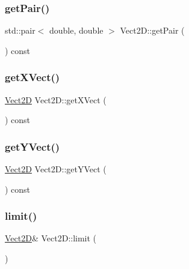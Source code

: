 \mbox{\label{classVect2D_a347f48c0f8fb2f05592251f78be33a5c_a347f48c0f8fb2f05592251f78be33a5c}} 
\subsubsection{\texorpdfstring{get\+Pair()}{getPair()}}
{\footnotesize\ttfamily std\+::pair$<$ double, double $>$ Vect2\+D\+::get\+Pair (\begin{DoxyParamCaption}{ }\end{DoxyParamCaption}) const}

\mbox{\label{classVect2D_a1bf72f44ebf9444c5f52a6499dc8dcb3_a1bf72f44ebf9444c5f52a6499dc8dcb3}} 
\subsubsection{\texorpdfstring{get\+X\+Vect()}{getXVect()}}
{\footnotesize\ttfamily \hyperlink{classVect2D}{Vect2D} Vect2\+D\+::get\+X\+Vect (\begin{DoxyParamCaption}{ }\end{DoxyParamCaption}) const}

\mbox{\label{classVect2D_a13e0a84562e7b1ebef4a530aaacfa060_a13e0a84562e7b1ebef4a530aaacfa060}} 
\subsubsection{\texorpdfstring{get\+Y\+Vect()}{getYVect()}}
{\footnotesize\ttfamily \hyperlink{classVect2D}{Vect2D} Vect2\+D\+::get\+Y\+Vect (\begin{DoxyParamCaption}{ }\end{DoxyParamCaption}) const}

\mbox{\label{classVect2D_a9836fb1bf48b847984cf438a6d48f9c2_a9836fb1bf48b847984cf438a6d48f9c2}} 
\subsubsection{\texorpdfstring{limit()}{limit()}\hspace{0.1cm}{\footnotesize\ttfamily [1/4]}}
{\footnotesize\ttfamily \hyperlink{classVect2D}{Vect2D}\& Vect2\+D\+::limit (\begin{DoxyParamCaption}\item[{const \hyperlink{classVect2D}{Vect2D} \&}]{ }\end{DoxyParamCaption})}

